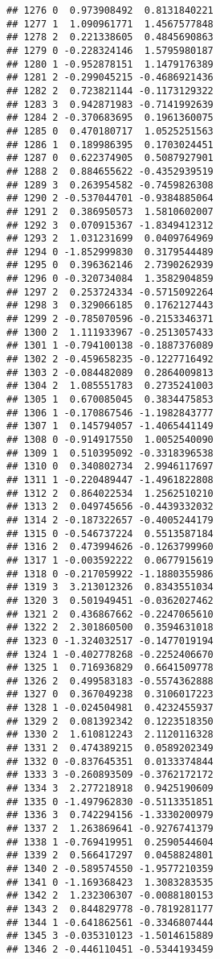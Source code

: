 \documentclass[
]{article}
\begin{document}
\begin{verbatim}
## 1276 0  0.973908492  0.8131840221
## 1277 1  1.090961771  1.4567577848
## 1278 2  0.221338605  0.4845690863
## 1279 0 -0.228324146  1.5795980187
## 1280 1 -0.952878151  1.1479176389
## 1281 2 -0.299045215 -0.4686921436
## 1282 2  0.723821144 -0.1173129322
## 1283 3  0.942871983 -0.7141992639
## 1284 2 -0.370683695  0.1961360075
## 1285 0  0.470180717  1.0525251563
## 1286 1  0.189986395  0.1703024451
## 1287 0  0.622374905  0.5087927901
## 1288 2  0.884655622 -0.4352939519
## 1289 3  0.263954582 -0.7459826308
## 1290 2 -0.537044701 -0.9384885064
## 1291 2  0.386950573  1.5810602007
## 1292 3  0.070915367 -1.8349412312
## 1293 2  1.031231699  0.0409764969
## 1294 0 -1.852999830  0.3179544489
## 1295 0  0.396362146  2.7390262939
## 1296 0 -0.320734084  1.3582904859
## 1297 2  0.253724334 -0.5715092264
## 1298 3  0.329066185  0.1762127443
## 1299 2 -0.785070596 -0.2153346371
## 1300 2  1.111933967 -0.2513057433
## 1301 1 -0.794100138 -0.1887376089
## 1302 2 -0.459658235 -0.1227716492
## 1303 2 -0.084482089  0.2864009813
## 1304 2  1.085551783  0.2735241003
## 1305 1  0.670085045  0.3834475853
## 1306 1 -0.170867546 -1.1982843777
## 1307 1  0.145794057 -1.4065441149
## 1308 0 -0.914917550  1.0052540090
## 1309 1  0.510395092 -0.3318396538
## 1310 0  0.340802734  2.9946117697
## 1311 1 -0.220489447 -1.4961822808
## 1312 2  0.864022534  1.2562510210
## 1313 2  0.049745656 -0.4439332032
## 1314 2 -0.187322657 -0.4005244179
## 1315 0 -0.546737224  0.5513587184
## 1316 2  0.473994626 -0.1263799960
## 1317 1 -0.003592222  0.0677915619
## 1318 0 -0.217059922 -1.1880355986
## 1319 3  3.213012326  0.8343551034
## 1320 3  0.501949451 -0.0362027462
## 1321 2  0.436867662 -0.2247065610
## 1322 2  2.301860500  0.3594631018
## 1323 0 -1.324032517 -0.1477019194
## 1324 1 -0.402778268 -0.2252406670
## 1325 1  0.716936829  0.6641509778
## 1326 2  0.499583183 -0.5574362888
## 1327 0  0.367049238  0.3106017223
## 1328 1 -0.024504981  0.4232455937
## 1329 2  0.081392342  0.1223518350
## 1330 2  1.610812243  2.1120116328
## 1331 2  0.474389215  0.0589202349
## 1332 0 -0.837645351  0.0133374844
## 1333 3 -0.260893509 -0.3762172172
## 1334 3  2.277218918  0.9425190609
## 1335 0 -1.497962830 -0.5113351851
## 1336 3  0.742294156 -1.3330200979
## 1337 2  1.263869641 -0.9276741379
## 1338 1 -0.769419951  0.2590544604
## 1339 2  0.566417297  0.0458824801
## 1340 2 -0.589574550 -1.9577210359
## 1341 0 -1.169368423  1.3083283535
## 1342 2  1.232306307 -0.0088180153
## 1343 2  0.844829778 -0.7819281177
## 1344 1 -0.641862561 -0.3346807444
## 1345 3 -0.035310123 -1.5014615889
## 1346 2 -0.446110451 -0.5344193459

\end{verbatim}
\end{document}
